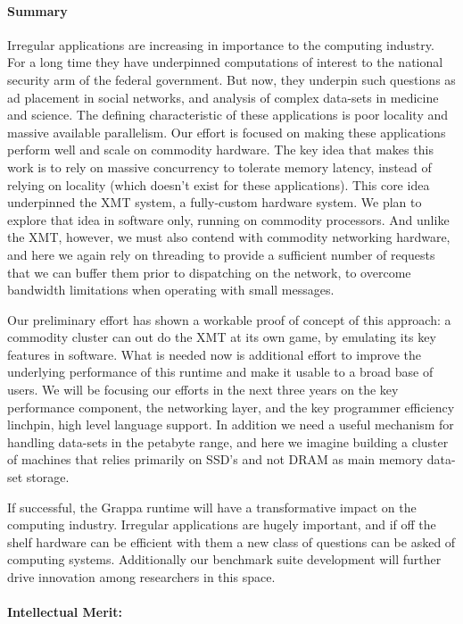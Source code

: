 \paragraph{Summary}

Irregular applications are increasing in importance to the computing industry. For a long time they have underpinned computations of interest to the national security arm of the federal government. But now, they underpin such questions as ad placement in social networks, and analysis of complex data-sets in medicine and science. The defining characteristic of these applications is poor locality and massive available parallelism. Our effort is focused on making these applications perform well and scale on commodity hardware. The key idea that makes this work is to rely on massive concurrency to tolerate memory latency, instead of relying on locality (which doesn't exist for these applications). This core idea underpinned the XMT system, a fully-custom hardware system. We plan to explore that idea in software only, running on commodity processors. And unlike the XMT, however, we must also contend with commodity networking hardware, and here we again rely on threading to provide a sufficient number of requests that we can buffer them prior to dispatching on the network, to overcome bandwidth limitations when operating with small messages.

Our preliminary effort has shown a workable proof of concept of this approach: a commodity cluster can out do the XMT at its own game, by emulating its key features in software. What is needed now is additional effort to improve the underlying performance of this runtime and make it usable to a broad base of users. We will be focusing our efforts in the next three years on the key performance component, the networking layer, and the key programmer efficiency linchpin, high level language support. In addition we need a useful mechanism for handling data-sets in the petabyte range, and here we imagine building a cluster of machines that relies primarily on SSD's and not DRAM as main memory data-set storage.

If successful, the Grappa runtime will have a transformative impact on the computing industry. Irregular applications are hugely important, and if off the shelf hardware can be efficient with them a new class of questions can be asked of computing systems. Additionally our benchmark suite development will further drive innovation among researchers in this space.

\paragraph{Intellectual Merit:}

